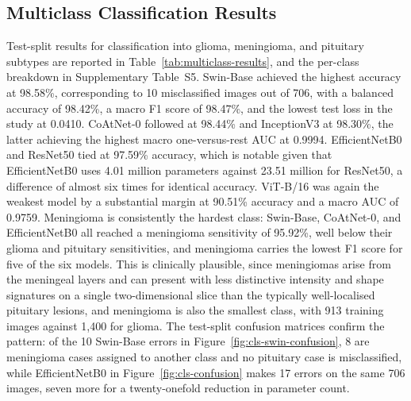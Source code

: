 \documentclass[final,3p,times,number]{elsarticle}
\begin{document}
\subsection{Multiclass Classification Results}
\label{sec:multiclass-results}

Test-split results for classification into glioma, meningioma, and pituitary subtypes are reported in Table~\ref{tab:multiclass-results}, and the per-class breakdown in Supplementary Table~S5. Swin-Base achieved the highest accuracy at 98.58\%, corresponding to 10 misclassified images out of 706, with a balanced accuracy of 98.42\%, a macro F1 score of 98.47\%, and the lowest test loss in the study at 0.0410. CoAtNet-0 followed at 98.44\% and InceptionV3 at 98.30\%, the latter achieving the highest macro one-versus-rest AUC at 0.9994. EfficientNetB0 and ResNet50 tied at 97.59\% accuracy, which is notable given that EfficientNetB0 uses 4.01 million parameters against 23.51 million for ResNet50, a difference of almost six times for identical accuracy. ViT-B/16 was again the weakest model by a substantial margin at 90.51\% accuracy and a macro AUC of 0.9759. Meningioma is consistently the hardest class: Swin-Base, CoAtNet-0, and EfficientNetB0 all reached a meningioma sensitivity of 95.92\%, well below their glioma and pituitary sensitivities, and meningioma carries the lowest F1 score for five of the six models. This is clinically plausible, since meningiomas arise from the meningeal layers and can present with less distinctive intensity and shape signatures on a single two-dimensional slice than the typically well-localised pituitary lesions, and meningioma is also the smallest class, with 913 training images against 1,400 for glioma. The test-split confusion matrices confirm the pattern: of the 10 Swin-Base errors in Figure~\ref{fig:cls-swin-confusion}, 8 are meningioma cases assigned to another class and no pituitary case is misclassified, while EfficientNetB0 in Figure~\ref{fig:cls-confusion} makes 17 errors on the same 706 images, seven more for a twenty-onefold reduction in parameter count.
\end{document}
